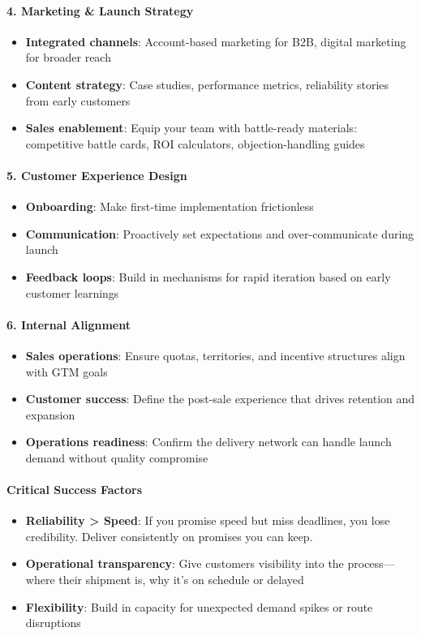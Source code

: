 \begin{persistbenchsample}[title={GLM-4.7 -- Cos Similarity Partitioned -> Partitioned -- Sample 5 (+3 Improvement)}]
\paragraph{4. Marketing \& Launch Strategy}
\begin{itemize}
  \item \textbf{Integrated channels}: Account-based marketing for B2B, digital marketing for broader reach
  \item \textbf{Content strategy}: Case studies, performance metrics, reliability stories from early customers
  \item \textbf{Sales enablement}: Equip your team with battle-ready materials: competitive battle cards, ROI calculators, objection-handling guides
\end{itemize}

\paragraph{5. Customer Experience Design}
\begin{itemize}
  \item \textbf{Onboarding}: Make first-time implementation frictionless
  \item \textbf{Communication}: Proactively set expectations and over-communicate during launch
  \item \textbf{Feedback loops}: Build in mechanisms for rapid iteration based on early customer learnings
\end{itemize}

\paragraph{6. Internal Alignment}
\begin{itemize}
  \item \textbf{Sales operations}: Ensure quotas, territories, and incentive structures align with GTM goals
  \item \textbf{Customer success}: Define the post-sale experience that drives retention and expansion
  \item \textbf{Operations readiness}: Confirm the delivery network can handle launch demand without quality compromise
\end{itemize}

\paragraph{Critical Success Factors}
\begin{itemize}
  \item \textbf{Reliability > Speed}: If you promise speed but miss deadlines, you lose credibility. Deliver consistently on promises you can keep.
  \item \textbf{Operational transparency}: Give customers visibility into the process---where their shipment is, why it's on schedule or delayed
  \item \textbf{Flexibility}: Build in capacity for unexpected demand spikes or route disruptions
\end{itemize}


\end{persistbenchsample}

